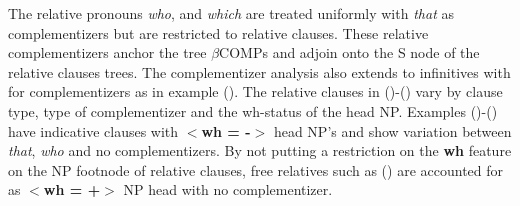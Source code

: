 The relative pronouns {\it who\/}, and {\it which\/} are treated
uniformly with {\it that}
as complementizers but are restricted to relative clauses. These relative
complementizers anchor the tree $\beta$COMPs  and adjoin onto the S node
of the relative clauses trees.  The complementizer
analysis also extends to infinitives with for complementizers as in
example ().  
The relative clauses in ()-() vary by clause type, type of complementizer
and the wh-status of the head NP.  Examples ()-() have indicative
clauses with {\bf $<$wh = -$>$} head NP's and show variation between
{\it that\/}, {\it who\/} and
no complementizers.   
By not putting a restriction on the {\bf wh} feature on the NP footnode of
relative clauses, free relatives such as () are accounted for
as {\bf $<$wh =
+$>$}  NP head with no complementizer.

